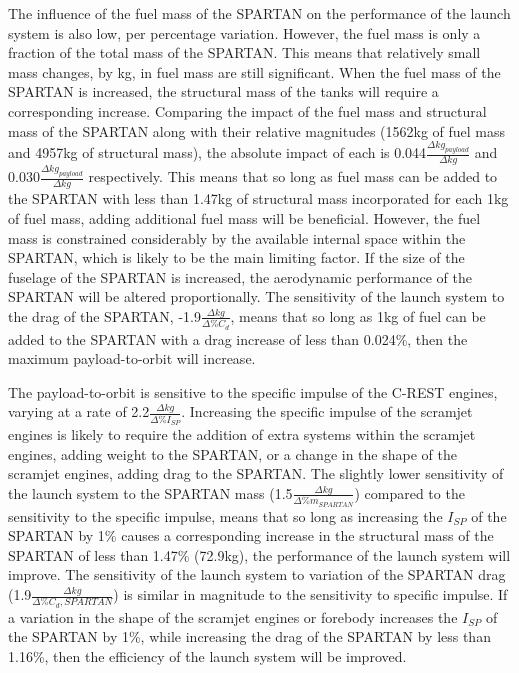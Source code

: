 The influence of the fuel mass of the SPARTAN on the performance of the launch system is also low, per percentage variation. However, the fuel mass is only a fraction of the total mass of the SPARTAN. This means that relatively small mass changes, by kg, in fuel mass are still significant. 
When the fuel mass of the SPARTAN is increased, the structural mass of the tanks will require a corresponding increase. 
Comparing the impact of the fuel mass and structural mass of the SPARTAN along with their relative magnitudes (1562kg of fuel mass and 4957kg of structural mass), the absolute impact of each is 0.044$\frac{\Delta kg_{payload}}{\Delta kg}$ and 0.030$\frac{\Delta kg_{payload}}{\Delta kg}$ respectively. This means that so long as fuel mass can be added to the SPARTAN with less than 1.47kg of structural mass incorporated for each 1kg of fuel mass, adding additional fuel mass will be beneficial. However, the fuel mass is constrained considerably by the available internal space within the SPARTAN, which is likely to be the main limiting factor.
If the size of the fuselage of the SPARTAN is increased, the aerodynamic performance of the SPARTAN will be altered proportionally. 
The sensitivity of the launch system to the drag of the SPARTAN, -1.9$\frac{\Delta kg}{\Delta\%C_{d}}$, means that so long as 1kg of fuel can be added to the SPARTAN with a drag increase of less than 0.024\%, then the maximum payload-to-orbit will increase. 


The payload-to-orbit is sensitive to the specific impulse of the C-REST engines, varying at a rate of 2.2$\frac{\Delta kg}{\Delta\%I_{SP}}$. Increasing the specific impulse of the scramjet engines is likely to require the addition of extra systems within the scramjet engines, adding weight to the SPARTAN, or a change in the shape of the scramjet engines, adding drag to the SPARTAN. 
The slightly lower sensitivity of the launch system to the SPARTAN mass (1.5$\frac{\Delta kg}{\Delta\%m_{SPARTAN}}$) compared to the sensitivity to the specific impulse, means that so long as increasing the $I_{SP}$ of the SPARTAN by 1\% causes a corresponding increase in the structural mass of the SPARTAN of less than 1.47\% (72.9kg), the performance of the launch system will improve. 
The sensitivity of the launch system to variation of the SPARTAN drag (1.9$\frac{\Delta kg}{\Delta\%C_d,{SPARTAN}}$) is similar in magnitude to the sensitivity to specific impulse. 
If a variation in the shape of the scramjet engines or forebody increases the $I_{SP}$ of the SPARTAN by 1\%, while increasing the drag of the SPARTAN by less than 1.16\%, then the efficiency of the launch system will be improved. 


